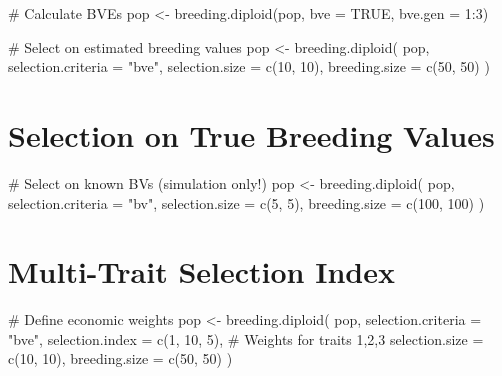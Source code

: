\documentclass[
  letterpaper,
]{book}
\newenvironment{Shaded}{\begin{snugshade}}{\end{snugshade}}
\newcommand{\AttributeTok}[1]{\textcolor[rgb]{0.40,0.45,0.13}{#1}}
\newcommand{\CommentTok}[1]{\textcolor[rgb]{0.37,0.37,0.37}{#1}}
\newcommand{\ConstantTok}[1]{\textcolor[rgb]{0.56,0.35,0.01}{#1}}
\newcommand{\DecValTok}[1]{\textcolor[rgb]{0.68,0.00,0.00}{#1}}
\newcommand{\FunctionTok}[1]{\textcolor[rgb]{0.28,0.35,0.67}{#1}}
\newcommand{\NormalTok}[1]{\textcolor[rgb]{0.00,0.23,0.31}{#1}}
\newcommand{\OtherTok}[1]{\textcolor[rgb]{0.00,0.23,0.31}{#1}}
\newcommand{\SpecialCharTok}[1]{\textcolor[rgb]{0.37,0.37,0.37}{#1}}
\newcommand{\StringTok}[1]{\textcolor[rgb]{0.13,0.47,0.30}{#1}}
\begin{document}
\begin{Shaded}
\begin{Highlighting}[]
\CommentTok{\# Calculate BVEs}
\NormalTok{pop }\OtherTok{\textless{}{-}} \FunctionTok{breeding.diploid}\NormalTok{(pop, }\AttributeTok{bve =} \ConstantTok{TRUE}\NormalTok{, }\AttributeTok{bve.gen =} \DecValTok{1}\SpecialCharTok{:}\DecValTok{3}\NormalTok{)}

\CommentTok{\# Select on estimated breeding values}
\NormalTok{pop }\OtherTok{\textless{}{-}} \FunctionTok{breeding.diploid}\NormalTok{(}
\NormalTok{  pop,}
  \AttributeTok{selection.criteria =} \StringTok{"bve"}\NormalTok{,}
  \AttributeTok{selection.size =} \FunctionTok{c}\NormalTok{(}\DecValTok{10}\NormalTok{, }\DecValTok{10}\NormalTok{),}
  \AttributeTok{breeding.size =} \FunctionTok{c}\NormalTok{(}\DecValTok{50}\NormalTok{, }\DecValTok{50}\NormalTok{)}
\NormalTok{)}
\end{Highlighting}
\end{Shaded}

\section{Selection on True Breeding
Values}\label{selection-on-true-breeding-values}

\begin{Shaded}
\begin{Highlighting}[]
\CommentTok{\# Select on known BVs (simulation only!)}
\NormalTok{pop }\OtherTok{\textless{}{-}} \FunctionTok{breeding.diploid}\NormalTok{(}
\NormalTok{  pop,}
  \AttributeTok{selection.criteria =} \StringTok{"bv"}\NormalTok{,}
  \AttributeTok{selection.size =} \FunctionTok{c}\NormalTok{(}\DecValTok{5}\NormalTok{, }\DecValTok{5}\NormalTok{),}
  \AttributeTok{breeding.size =} \FunctionTok{c}\NormalTok{(}\DecValTok{100}\NormalTok{, }\DecValTok{100}\NormalTok{)}
\NormalTok{)}
\end{Highlighting}
\end{Shaded}

\section{Multi-Trait Selection Index}\label{multi-trait-selection-index}

\begin{Shaded}
\begin{Highlighting}[]
\CommentTok{\# Define economic weights}
\NormalTok{pop }\OtherTok{\textless{}{-}} \FunctionTok{breeding.diploid}\NormalTok{(}
\NormalTok{  pop,}
  \AttributeTok{selection.criteria =} \StringTok{"bve"}\NormalTok{,}
  \AttributeTok{selection.index =} \FunctionTok{c}\NormalTok{(}\DecValTok{1}\NormalTok{, }\DecValTok{10}\NormalTok{, }\DecValTok{5}\NormalTok{),  }\CommentTok{\# Weights for traits 1,2,3}
  \AttributeTok{selection.size =} \FunctionTok{c}\NormalTok{(}\DecValTok{10}\NormalTok{, }\DecValTok{10}\NormalTok{),}
  \AttributeTok{breeding.size =} \FunctionTok{c}\NormalTok{(}\DecValTok{50}\NormalTok{, }\DecValTok{50}\NormalTok{)}
\NormalTok{)}
\end{Highlighting}
\end{Shaded}
\end{document}
